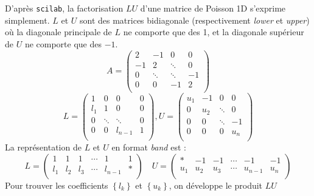 \documentclass{article}
\begin{document}
D'après \texttt{scilab}, la factorisation $LU$ d'une matrice de Poisson 1D s'exprime simplement. $L$ et $U$ sont des matrices bidiagonale (respectivement \textit{lower} et \textit{upper}) où la diagonale principale de $L$ ne comporte que des 1, et la diagonale supérieur de $U$ ne comporte que des $-1$.
\[
	A = 
	\begin{pmatrix}
			2	& 	-1	&	0	& 0	\\
			-1	&	2	&\ddots	& 0	\\
			0	& \ddots&\ddots	&-1	\\
			0	& 	0	& -1 	& 2	\\
	\end{pmatrix}
\]
\[
	L = 
	\begin{pmatrix}
			1	& 	0	&	0	& 0	\\
			l_1	&	1	&	0	& 0	\\
			0	& \ddots&\ddots	& 0	\\
			0	& 	0	& l_{n-1} 	& 1	\\
	\end{pmatrix},
	U = 
	\begin{pmatrix}
			u_1	& 	-1	&	0	& 0	\\
			0	&	u_2	&\ddots	& 0	\\
			0	& 	0	&\ddots	& -1\\
			0	& 	0	& 0 	& u_n	\\
	\end{pmatrix}
\]
La représentation de $L$ et $U$ en format \textit{band} est :
\[
	L = 
	\begin{pmatrix}
		1	& 	1	&	1	&	\cdots	&	1		&	1	\\
		l_1	& 	l_2	&	l_3	&	\cdots	&	l_{n-1}	&	\ast	\\
	\end{pmatrix}
	\quad
	U = 
	\begin{pmatrix}
		\ast& 	-1	&	-1	&	\cdots	&	-1		&	-1	\\
		u_1	& 	u_2	&	u_3	&	\cdots	&	u_{n-1}	&	u_n	\\
	\end{pmatrix}
\]
Pour trouver les coefficients $\left\lbrace l_k \right\rbrace$ et $\left\lbrace u_k \right\rbrace$, on développe le produit $LU$
\end{document}
